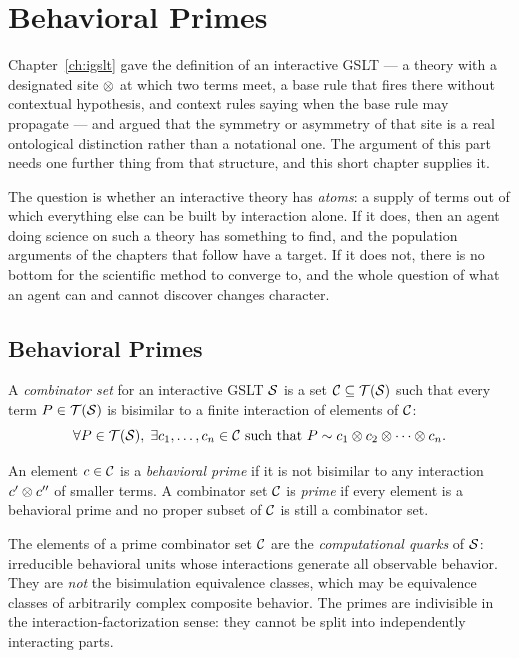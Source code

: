 \chapter{Behavioral Primes}
\label{sec:combinators}

Chapter~\ref{ch:igslt} gave the definition of an interactive GSLT --- a
theory with a designated site $\otimes$ at which two terms meet, a base
rule that fires there without contextual hypothesis, and context rules
saying when the base rule may propagate --- and argued that the symmetry
or asymmetry of that site is a real ontological distinction rather than a
notational one.
The argument of this part needs one further thing from that structure,
and this short chapter supplies it.

The question is whether an interactive theory has \emph{atoms}: a
supply of terms out of which everything else can be built by interaction
alone.
If it does, then an agent doing science on such a theory has something to
find, and the population arguments of the chapters that follow have a
target.
If it does not, there is no bottom for the scientific method to converge
to, and the whole question of what an agent can and cannot discover
changes character.

\section{Behavioral Primes}

\begin{definition}
A \emph{combinator set} for an interactive GSLT $\mathcal{S}$ is a set
$\mathcal{C} \subseteq \mathcal{T}(\mathcal{S})$ such that every term
$P \in \mathcal{T}(\mathcal{S})$ is bisimilar to a finite interaction of
elements of $\mathcal{C}$:
\[
  \forall P \in \mathcal{T}(\mathcal{S}),\;
  \exists c_1, \ldots, c_n \in \mathcal{C} \text{ such that }
  P \sim c_1 \otimes c_2 \otimes \cdots \otimes c_n.
\]
\end{definition}

\begin{definition}
An element $c \in \mathcal{C}$ is a \emph{behavioral prime} if it is not
bisimilar to any interaction $c' \otimes c''$ of smaller terms.
A combinator set $\mathcal{C}$ is \emph{prime} if every element is a
behavioral prime and no proper subset of $\mathcal{C}$ is still a
combinator set.
\end{definition}

\begin{remark}
The elements of a prime combinator set $\mathcal{C}$ are the
\emph{computational quarks} of $\mathcal{S}$: irreducible behavioral units
whose interactions generate all observable behavior.
They are \emph{not} the bisimulation equivalence classes, which may
be equivalence classes of arbitrarily complex composite behavior.
The primes are indivisible in the interaction-factorization sense:
they cannot be split into independently interacting parts.
\end{remark}

